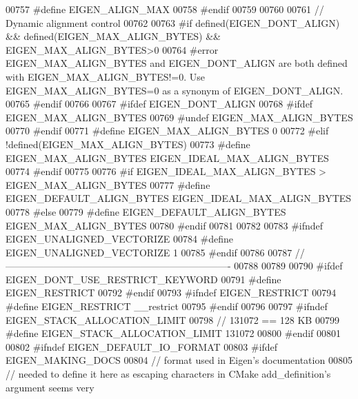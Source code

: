 \begin{DoxyCode}
00757 \textcolor{preprocessor}{#define EIGEN\_ALIGN\_MAX}
00758 \textcolor{preprocessor}{#endif}
00759 
00760 
00761 \textcolor{comment}{// Dynamic alignment control}
00762 
00763 \textcolor{preprocessor}{#if defined(EIGEN\_DONT\_ALIGN) && defined(EIGEN\_MAX\_ALIGN\_BYTES) && EIGEN\_MAX\_ALIGN\_BYTES>0}
00764 \textcolor{preprocessor}{#error EIGEN\_MAX\_ALIGN\_BYTES and EIGEN\_DONT\_ALIGN are both defined with EIGEN\_MAX\_ALIGN\_BYTES!=0. Use
       EIGEN\_MAX\_ALIGN\_BYTES=0 as a synonym of EIGEN\_DONT\_ALIGN.}
00765 \textcolor{preprocessor}{#endif}
00766 
00767 \textcolor{preprocessor}{#ifdef EIGEN\_DONT\_ALIGN}
00768 \textcolor{preprocessor}{  #ifdef EIGEN\_MAX\_ALIGN\_BYTES}
00769 \textcolor{preprocessor}{    #undef EIGEN\_MAX\_ALIGN\_BYTES}
00770 \textcolor{preprocessor}{  #endif}
00771 \textcolor{preprocessor}{  #define EIGEN\_MAX\_ALIGN\_BYTES 0}
00772 \textcolor{preprocessor}{#elif !defined(EIGEN\_MAX\_ALIGN\_BYTES)}
00773 \textcolor{preprocessor}{  #define EIGEN\_MAX\_ALIGN\_BYTES EIGEN\_IDEAL\_MAX\_ALIGN\_BYTES}
00774 \textcolor{preprocessor}{#endif}
00775 
00776 \textcolor{preprocessor}{#if EIGEN\_IDEAL\_MAX\_ALIGN\_BYTES > EIGEN\_MAX\_ALIGN\_BYTES}
00777 \textcolor{preprocessor}{#define EIGEN\_DEFAULT\_ALIGN\_BYTES EIGEN\_IDEAL\_MAX\_ALIGN\_BYTES}
00778 \textcolor{preprocessor}{#else}
00779 \textcolor{preprocessor}{#define EIGEN\_DEFAULT\_ALIGN\_BYTES EIGEN\_MAX\_ALIGN\_BYTES}
00780 \textcolor{preprocessor}{#endif}
00781 
00782 
00783 \textcolor{preprocessor}{#ifndef EIGEN\_UNALIGNED\_VECTORIZE}
00784 \textcolor{preprocessor}{#define EIGEN\_UNALIGNED\_VECTORIZE 1}
00785 \textcolor{preprocessor}{#endif}
00786 
00787 \textcolor{comment}{//----------------------------------------------------------------------}
00788 
00789 
00790 \textcolor{preprocessor}{#ifdef EIGEN\_DONT\_USE\_RESTRICT\_KEYWORD}
00791 \textcolor{preprocessor}{  #define EIGEN\_RESTRICT}
00792 \textcolor{preprocessor}{#endif}
00793 \textcolor{preprocessor}{#ifndef EIGEN\_RESTRICT}
00794 \textcolor{preprocessor}{  #define EIGEN\_RESTRICT \_\_restrict}
00795 \textcolor{preprocessor}{#endif}
00796 
00797 \textcolor{preprocessor}{#ifndef EIGEN\_STACK\_ALLOCATION\_LIMIT}
00798 \textcolor{comment}{// 131072 == 128 KB}
00799 \textcolor{preprocessor}{#define EIGEN\_STACK\_ALLOCATION\_LIMIT 131072}
00800 \textcolor{preprocessor}{#endif}
00801 
00802 \textcolor{preprocessor}{#ifndef EIGEN\_DEFAULT\_IO\_FORMAT}
00803 \textcolor{preprocessor}{#ifdef EIGEN\_MAKING\_DOCS}
00804 \textcolor{comment}{// format used in Eigen's documentation}
00805 \textcolor{comment}{// needed to define it here as escaping characters in CMake add\_definition's argument seems very
}
\end{DoxyCode}
